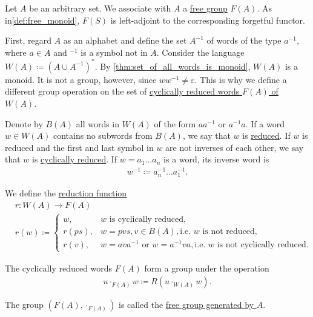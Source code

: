 \begin{definition}\label{def:free_group}\cite[306]{Knapp2016BAlg}
  Let $A$ be an arbitrary set. We associate with $A$ a \uline{free group} $F(A)$. As in\cref{def:free_monoid}, $F(S)$ is left-adjoint to the corresponding forgetful functor.

  First, regard $A$ as an alphabet and define the set $A^{-1}$ of words of the type $a^{-1}$, where $a \in A$ and $\mbox{}^{-1}$ is a symbol not in $A$. Consider the language $W(A) \coloneqq (A \cup A^{-1})^{*}$. By \cref{thm:set_of_all_words_is_monoid}, $W(A)$ is a monoid. It is not a group, however, since $w w^{-1} \neq \varepsilon$. This is why we define a different group operation on the set of \uline{cyclically reduced words $F(A)$ of $W(A)$}.

  Denote by $B(A)$ all words in $W(A)$ of the form $aa^{-1}$ or $a^{-1}a$. If a word $w \in W(A)$ contains no subwords from $B(A)$, we say that $w$ is \uline{reduced}. If $w$ is reduced and the first and last symbol in $w$ are not inverses of each other, we say that $w$ is \uline{cyclically reduced}. If $w = a_1 \ldots a_n$ is a word, its inverse word is
  \begin{align*}
    w^{-1} \coloneqq a_n^{-1} \ldots a_1^{-1}.
  \end{align*}

  We define the \uline{reduction function}
  \begin{align*}
    &r: W(A) \to F(A) \\
    &r(w) \coloneqq \begin{cases}
      w, &w \text{ is cyclically reduced}, \\
      r(ps), &w = pvs, v \in B(A), \text{i.e. $w$ is not reduced}, \\
      r(v), &w = ava^{-1} \text{ or } w = a^{-1}va, \text{i.e. $w$ is not cyclically reduced}.
    \end{cases}
  \end{align*}

  The cyclically reduced words $F(A)$ form a group under the operation
  \begin{align*}
    u \cdot_{F(A)} w \coloneqq R(u \cdot_{W(A)} w).
  \end{align*}

  The group $(F(A), \cdot_{F(A)})$ is called the \uline{free group generated by $A$}.
\end{definition}
